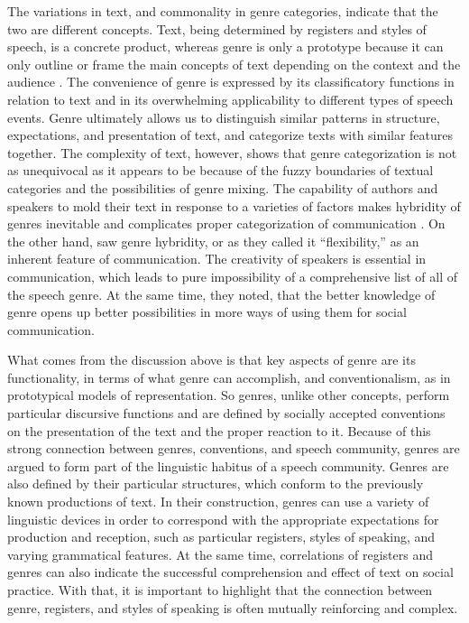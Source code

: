 \documentclass[12pt]{article}
\begin{document}
The variations in text, and commonality in genre categories, indicate that the two are different concepts. Text, being determined by registers and styles of speech, is a concrete product, whereas genre is only a prototype because it can only outline or frame the main concepts of text depending on the context and the audience \parencite{bax2011}. The convenience of genre is expressed by its classificatory functions in relation to text and in its overwhelming applicability to different types of speech events. Genre ultimately allows us to distinguish similar patterns in structure, expectations, and presentation of text, and categorize texts with similar features together. The complexity of text, however, shows that genre categorization is not as unequivocal as it appears to be because of the fuzzy boundaries of textual categories and the possibilities of genre mixing. The capability of authors and speakers to mold their text in response to a varieties of factors makes hybridity of genres inevitable and complicates proper categorization of communication \parencite{bax2011}. On the other hand, \textcite{bakhtin1986} saw genre hybridity, or as they called it ``flexibility,'' as an inherent feature of communication. The creativity of speakers is essential in communication, which leads to pure impossibility of a comprehensive list of all of the speech genre. At the same time, they noted, that the better knowledge of genre opens up better possibilities in more ways of using them for social communication.


What comes from the discussion above is that key aspects of genre are its functionality, in terms of what genre can accomplish, and conventionalism, as in prototypical models of representation. So genres, unlike other concepts, perform particular discursive functions and are defined by socially accepted conventions on the presentation of the text and the proper reaction to it. Because of this strong connection between genres, conventions, and speech community, genres are argued to form part of the linguistic habitus of a speech community. Genres are also defined by their particular structures, which conform to the previously known productions of text. In their construction, genres can use a variety of linguistic devices in order to correspond with the appropriate expectations for production and reception, such as particular registers, styles of speaking, and varying grammatical features. At the same time, correlations of registers and genres can also indicate the successful comprehension and effect of text on  social practice. With that, it is important to highlight that the connection between genre, registers, and styles of speaking is often mutually reinforcing and complex. 
\end{document}
